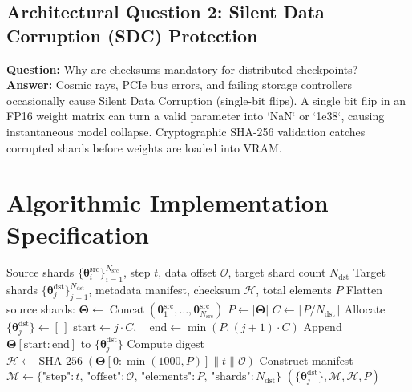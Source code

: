 \documentclass[11pt,a4paper]{article}
\theoremstyle{definition}
\begin{document}
\subsection{Architectural Question 2: Silent Data Corruption (SDC) Protection}
\textbf{Question:} Why are checksums mandatory for distributed checkpoints?\\
\textbf{Answer:} Cosmic rays, PCIe bus errors, and failing storage controllers occasionally cause Silent Data Corruption (single-bit flips). A single bit flip in an FP16 weight matrix can turn a valid parameter into `NaN` or `1e38`, causing instantaneous model collapse. Cryptographic SHA-256 validation catches corrupted shards before weights are loaded into VRAM.

\section{Algorithmic Implementation Specification}

\begin{algorithm}[H]
\caption{Distributed Checkpoint Serialization and Resharding}
\begin{algorithmic}[1]
\Require Source shards $\{\mathbf{\theta}_i^{\text{src}}\}_{i=1}^{N_{\text{src}}}$, step $t$, data offset $\mathcal{O}$, target shard count $N_{\text{dst}}$
\Ensure Target shards $\{\mathbf{\theta}_j^{\text{dst}}\}_{j=1}^{N_{\text{dst}}}$, metadata manifest, checksum $\mathcal{H}$, total elements $P$
\State Flatten source shards: $\mathbf{\Theta} \gets \operatorname{Concat}(\mathbf{\theta}_1^{\text{src}}, \dots, \mathbf{\theta}_{N_{\text{src}}}^{\text{src}})$
\State $P \gets |\mathbf{\Theta}|$
\State $C \gets \lceil P / N_{\text{dst}} \rceil$
\State Allocate $\{\mathbf{\theta}_j^{\text{dst}}\} \gets [\,]$
    \State $\text{start} \gets j \cdot C, \quad \text{end} \gets \min(P, (j + 1) \cdot C)$
    \State Append $\mathbf{\Theta}[\text{start} : \text{end}]$ to $\{\mathbf{\theta}_j^{\text{dst}}\}$
\EndFor
\State Compute digest $\mathcal{H} \gets \operatorname{SHA-256}(\mathbf{\Theta}[0 : \min(1000, P)] \parallel t \parallel \mathcal{O})$
\State Construct manifest $\mathcal{M} \gets \{ \text{"step"}: t, \, \text{"offset"}: \mathcal{O}, \, \text{"elements"}: P, \, \text{"shards"}: N_{\text{dst}} \}$
\State \Return $(\{\mathbf{\theta}_j^{\text{dst}}\}, \mathcal{M}, \mathcal{H}, P)$
\end{algorithmic}
\end{algorithm}
\end{document}
